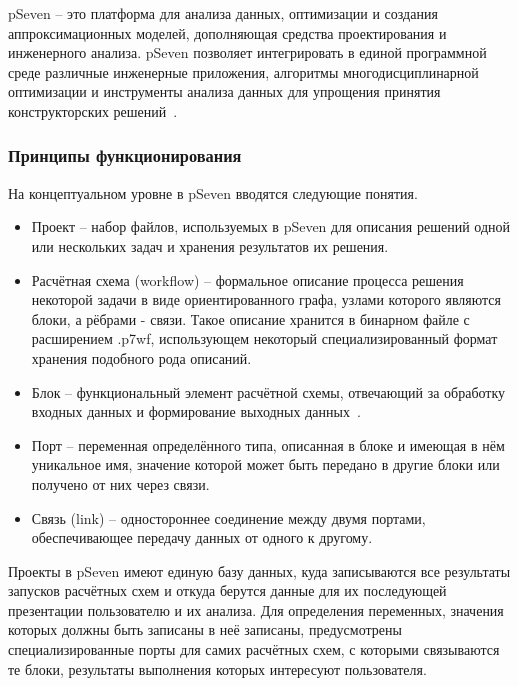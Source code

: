 \def\notedate{2021.11.06}
\def\currentauthor{Тришин И.В. (РК6)}%

\textsf{pSeven} -- это платформа для анализа данных, оптимизации и создания аппроксимационных моделей, дополняющая средства проектирования и инженерного анализа.
\textsf{pSeven} позволяет интегрировать в единой программной среде различные инженерные приложения, алгоритмы многодисциплинарной оптимизации и инструменты анализа данных для упрощения принятия конструкторских решений~\cite{DatadvanceOffWebsite2021}.

\subsubsection{Принципы функционирования}

На концептуальном уровне в \textsf{pSeven} вводятся следующие понятия.
\begin{itemize}
    \item Проект -- набор файлов, используемых в \textsf{pSeven} для описания решений одной или нескольких задач и хранения результатов их решения.
    \item Расчётная схема (workflow) -- формальное описание процесса решения некоторой задачи в виде ориентированного графа, узлами которого являются блоки, а рёбрами - связи. Такое описание хранится в бинарном файле с расширением \textsf{.p7wf}, использующем некоторый специализированный формат хранения подобного рода описаний.
    \item Блок -- функциональный элемент расчётной схемы, отвечающий за обработку входных данных и формирование выходных данных~\cite{pSevenDocsWorkflow2021}.
    \item Порт -- переменная определённого типа, описанная в блоке и имеющая в нём уникальное имя, значение которой может быть передано в другие блоки или получено от них через связи.
    \item Связь (link) -- одностороннее соединение между двумя портами, обеспечивающее передачу данных от одного к другому.
\end{itemize}

Проекты в \textsf{pSeven} имеют единую базу данных, куда записываются все результаты запусков расчётных схем и откуда берутся данные для их последующей презентации пользователю и их анализа. Для определения переменных, значения которых должны быть записаны в неё записаны, предусмотрены специализированные порты для самих расчётных схем, с которыми связываются те блоки, результаты выполнения которых интересуют пользователя.


